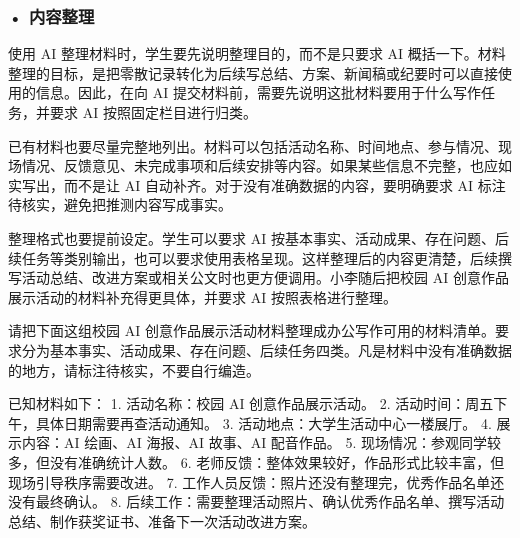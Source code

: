 \subsubsection*{\textbf{• 内容整理}}

使用 AI 整理材料时，学生要先说明整理目的，而不是只要求 AI 概括一下。材料整理的目标，是把零散记录转化为后续写总结、方案、新闻稿或纪要时可以直接使用的信息。因此，在向 AI 提交材料前，需要先说明这批材料要用于什么写作任务，并要求 AI 按照固定栏目进行归类。

已有材料也要尽量完整地列出。材料可以包括活动名称、时间地点、参与情况、现场情况、反馈意见、未完成事项和后续安排等内容。如果某些信息不完整，也应如实写出，而不是让 AI 自动补齐。对于没有准确数据的内容，要明确要求 AI 标注待核实，避免把推测内容写成事实。

整理格式也要提前设定。学生可以要求 AI 按基本事实、活动成果、存在问题、后续任务等类别输出，也可以要求使用表格呈现。这样整理后的内容更清楚，后续撰写活动总结、改进方案或相关公文时也更方便调用。小李随后把校园 AI 创意作品展示活动的材料补充得更具体，并要求 AI 按照表格进行整理。

\begin{userbox}
请把下面这组校园 AI 创意作品展示活动材料整理成办公写作可用的材料清单。要求分为基本事实、活动成果、存在问题、后续任务四类。凡是材料中没有准确数据的地方，请标注待核实，不要自行编造。

已知材料如下：
1. 活动名称：校园 AI 创意作品展示活动。
2. 活动时间：周五下午，具体日期需要再查活动通知。
3. 活动地点：大学生活动中心一楼展厅。
4. 展示内容：AI 绘画、AI 海报、AI 故事、AI 配音作品。
5. 现场情况：参观同学较多，但没有准确统计人数。
6. 老师反馈：整体效果较好，作品形式比较丰富，但现场引导秩序需要改进。
7. 工作人员反馈：照片还没有整理完，优秀作品名单还没有最终确认。
8. 后续工作：需要整理活动照片、确认优秀作品名单、撰写活动总结、制作获奖证书、准备下一次活动改进方案。
\end{userbox}


